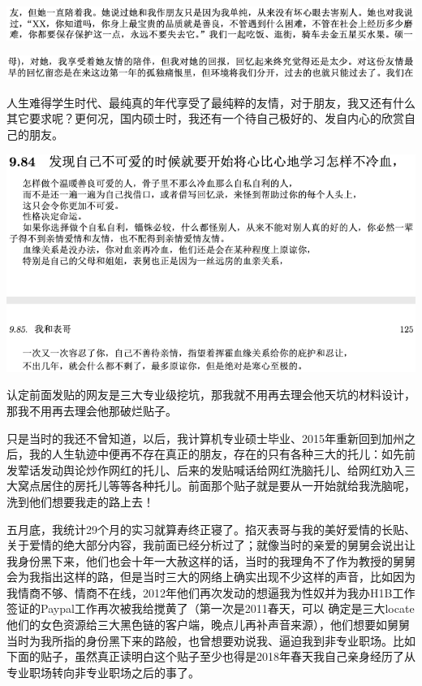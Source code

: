 \documentclass[9pt, b5paper]{article}
\begin{document}
\begin{center}
\includegraphics[width=.9\linewidth]{./pic/backups_plans_20210413_170800.png}
\end{center}

\begin{center}
\includegraphics[width=.9\linewidth]{./pic/backups_plans_20210413_170854.png}
\end{center}

人生难得学生时代、最纯真的年代享受了最纯粹的友情，对于朋友，我又还有什么其它要求呢？更何况，国内硕士时，我还有一个待自己极好的、发自内心的欣赏自己的朋友。

\begin{center}
\includegraphics[width=.9\linewidth]{./pic/backups_plans_20210417_231336.png}
\end{center}

认定前面发贴的网友是三大专业级挖坑，那我就不用再去理会他天坑的材料设计，那我不用再去理会他那破烂贴子。

只是当时的我还不曾知道，以后，我计算机专业硕士毕业、2015年重新回到加州之后，我的人生轨迹中便再不存在真正的朋友，存在的只有各种三大的托儿：如先前发荤话发动舆论炒作网红的托儿、后来的发贴喊话给网红洗脑托儿、给网红劝入三大窝点居住的房托儿等等各种托儿。前面那个贴子就是要从一开始就给我洗脑呢，洗到他们想要我走的路上去！

五月底，我统计29个月的实习就算寿终正寝了。掐灭表哥与我的美好爱情的长贴、关于爱情的绝大部分内容，我前面已经分析过了；就像当时的亲爱的舅舅会说出让我身份黑下来，他们也会十年一大赦这样的话，当时的我理角不了作为教授的舅舅会为我指出这样的路，但是当时三大的网络上确实出现不少这样的声音，比如因为我情商不够、情商不在线，2012年他们再次发动的想逼我为性奴并为我办H1B工作签证的Paypal工作再次被我给搅黄了（第一次是2011春天，可以
确定是三大locate他们的女色资源给三大黑色链的客户端，晚点儿再补声音来源），他们想要如舅舅当时为我所指的身份黑下来的路般，也曾想要劝说我、逼迫我到非专业职场。比如下面的贴子，虽然真正读明白这个贴子至少也得是2018年春天我自己亲身经历了从专业职场转向非专业职场之后的事了。
\end{document}
